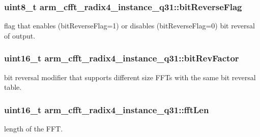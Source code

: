 \subsubsection[{\texorpdfstring{bit\+Reverse\+Flag}{bitReverseFlag}}]{\setlength{\rightskip}{0pt plus 5cm}uint8\+\_\+t arm\+\_\+cfft\+\_\+radix4\+\_\+instance\+\_\+q31\+::bit\+Reverse\+Flag}\hypertarget{structarm__cfft__radix4__instance__q31_a5a7c4f4c7b3fb655cbb2bc11ef160a2a}{}\label{structarm__cfft__radix4__instance__q31_a5a7c4f4c7b3fb655cbb2bc11ef160a2a}
flag that enables (bit\+Reverse\+Flag=1) or disables (bit\+Reverse\+Flag=0) bit reversal of output. 
\subsubsection[{\texorpdfstring{bit\+Rev\+Factor}{bitRevFactor}}]{\setlength{\rightskip}{0pt plus 5cm}uint16\+\_\+t arm\+\_\+cfft\+\_\+radix4\+\_\+instance\+\_\+q31\+::bit\+Rev\+Factor}\hypertarget{structarm__cfft__radix4__instance__q31_a94d2fead4efa4d5eaae142bbe30b0e15}{}\label{structarm__cfft__radix4__instance__q31_a94d2fead4efa4d5eaae142bbe30b0e15}
bit reversal modifier that supports different size F\+F\+Ts with the same bit reversal table. 
\subsubsection[{\texorpdfstring{fft\+Len}{fftLen}}]{\setlength{\rightskip}{0pt plus 5cm}uint16\+\_\+t arm\+\_\+cfft\+\_\+radix4\+\_\+instance\+\_\+q31\+::fft\+Len}\hypertarget{structarm__cfft__radix4__instance__q31_ab413d2a5d3f45fa187d93813bf3bf81b}{}\label{structarm__cfft__radix4__instance__q31_ab413d2a5d3f45fa187d93813bf3bf81b}
length of the F\+FT. 
